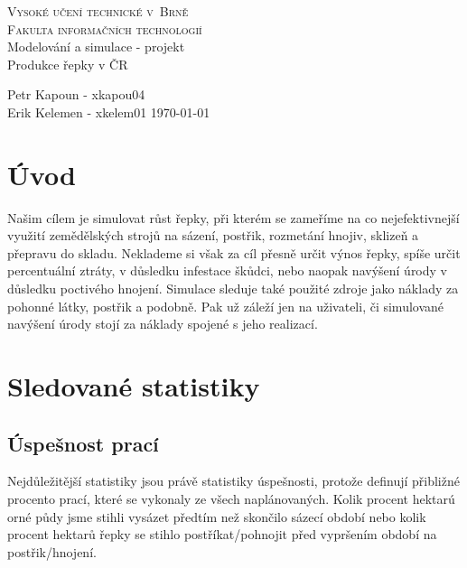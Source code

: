 \documentclass[11pt,a4paper,titlepage]{article}
\begin{document}
\begin{titlepage}
\begin{center}
    {\LARGE\textsc{Vysoké učení technické v~Brně}}\\
    \smallskip
    {\Large\textsc{Fakulta informačních technologií}}\\
    \bigskip
    \LARGE{Modelování a simulace - projekt}\\
    \smallskip
    \Huge{Produkce řepky v ČR}\\
\end{center}
    {\Large Petr Kapoun - xkapou04 \\ Erik Kelemen - xkelem01 \hfill \today }
\end{titlepage}

\tableofcontents
\newpage


\section{Úvod}
Našim cílem je simulovat růst řepky, při kterém se zameříme na co nejefektivnejší využití zemědělských strojů na sázení, postřik, rozmetání hnojiv, sklizeň a přepravu do skladu. Neklademe si však za cíl přesně určit výnos řepky, spíše určit percentuální ztráty, v důsledku infestace škůdci, nebo naopak navýšení úrody v důsledku poctivého hnojení. Simulace sleduje také použité zdroje jako náklady za pohonné látky, postřik a podobně. Pak už záleží jen na uživateli, či simulované navýšení úrody stojí za náklady spojené s jeho realizací.









\section{Sledované statistiky}
\subsection{Úspešnost prací}
Nejdůležitější statistiky jsou právě statistiky úspešnosti, protože definují přibližné procento prací, které se vykonaly ze všech naplánovaných. Kolik procent hektarú orné půdy jsme stihli vysázet předtím než skončilo sázecí období nebo kolik procent hektarů řepky se stihlo postříkat/pohnojit před vypršením období na postřik/hnojení.
\end{document}
